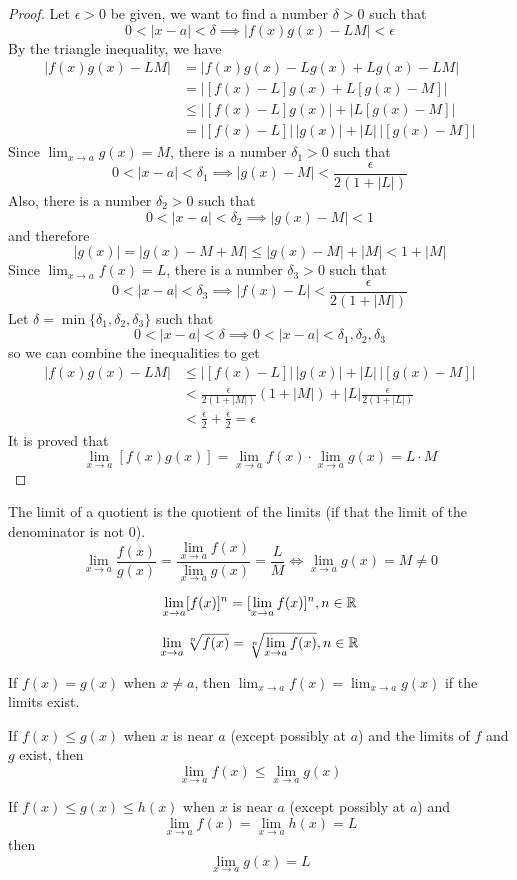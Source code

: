 \begin{proof}
    Let \(\epsilon>0\) be given, we want to find a number \(\delta>0\) such
    that \[0<|x-a|<\delta\implies|f(x)g(x)-LM|<\epsilon\]
    By the triangle inequality, we have
    \begin{align*}
        |f(x)g(x)-LM|&=|f(x)g(x)-Lg(x)+Lg(x)-LM| \\ &=|[f(x)-L]g(x)+L[g(x)-M]|
        \\ &\leq |[f(x)-L]g(x)|+|L[g(x)-M]| \\ &=|[f(x)-L]|\,|g(x)|+|L|\,|[g(x)-M]|
    \end{align*}
    Since \(\lim_{x\to a}g(x)=M\), there is a number \(\delta_1>0\) such that
    \[0<|x-a|<\delta_1\implies|g(x)-M|<\frac{\epsilon}{2(1+|L|)}\]
    Also, there is a number \(\delta_2>0\) such that
    \[0<|x-a|<\delta_2\implies|g(x)-M|<1\] and therefore
    \[|g(x)|=|g(x)-M+M|\leq|g(x)-M|+|M|<1+|M|\]
    Since \(\lim_{x\to a}f(x)=L\), there is a number \(\delta_3>0\) such that
    \[0<|x-a|<\delta_3\implies|f(x)-L|<\frac{\epsilon}{2(1+|M|)}\]
    Let \(\delta=\min\{\delta_1,\delta_2,\delta_3\}\) such that
    \[0<|x-a|<\delta\implies0<|x-a|<\delta_1,\delta_2,\delta_3\]
    so we can combine the inequalities to get
    \begin{align*}
        |f(x)g(x)-LM|&\leq|[f(x)-L]|\,|g(x)|+|L|\,|[g(x)-M]| \\
        &<\frac{\epsilon}{2(1+|M|)}(1+|M|)+|L|\frac{\epsilon}{2(1+|L|)} \\
        &<\frac{\epsilon}{2}+\frac{\epsilon}{2}=\epsilon
    \end{align*}
    It is proved that
    \[\lim_{x\to a}[f(x)g(x)]=\lim_{x\to a}f(x)\cdot\lim_{x\to a}g(x)=L\cdot M\]
\end{proof}
\begin{theorem}
    The limit of a quotient is the quotient of the limits (if that the
    limit of the denominator is not 0).
    \[\lim_{x\to a}\frac{f(x)}{g(x)}=\frac{\lim_{x\to a}f(x)}{\lim_{x\to a}g(x)}
    =\frac{L}{M}\iff\lim_{x\to a}g(x)=M\neq0\]
\end{theorem}
\begin{theorem}
    \[\lim_{x\to a}[f(x)]^n=[\lim_{x\to a}f(x)]^n,n\in\mathbb{R}\]
\end{theorem}
\begin{theorem}
    \[\lim_{x\to a}\sqrt[n]{f(x)}=\sqrt[n]{\lim_{x\to a}f(x)},n\in\mathbb{R}\]
\end{theorem}
If \(f(x)=g(x)\) when \(x\neq a\), then \(\lim_{x\to a}f(x)=\lim_{x\to a}g(x)\)
if the limits exist.
\begin{theorem}
    If \(f(x)\leq g(x)\) when \(x\) is near \(a\) (except possibly at \(a\))
    and the limits of \(f\) and \(g\) exist, then
    \[\lim_{x\to a}f(x)\leq\lim_{x\to a}g(x)\]
\end{theorem}
\begin{theorem}
    If \(f(x)\leq g(x)\leq h(x)\) when \(x\) is near \(a\) (except possibly at
    \(a\)) and \[\lim_{x\to a}f(x)=\lim_{x\to a}h(x)=L\] then \[\lim_{x\to a}g(x)=L\]
\end{theorem}
